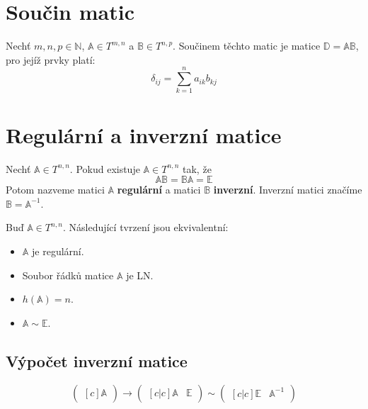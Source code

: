 \documentclass{../szzclass}
\begin{document}
\section{Součin matic}
Nechť $m,n,p\in \mathbb{N}$, $\mathbb{A}\in T^{m,n}$ a $\mathbb{B}\in T^{n,p}$. Součinem těchto matic je matice $\mathbb{D}=\mathbb{A}\mathbb{B}$, pro jejíž prvky platí:
$$
\delta_{ij}=\sum_{k=1}^{n}{a_{ik} b_{kj}}
$$

\section{Regulární a inverzní matice}
\begin{definition}
Nechť $\mathbb{A}\in T^{n,n}$. Pokud existuje $\mathbb{A}\in T^{n,n}$ tak, že 
$$
\mathbb{A}\mathbb{B}=\mathbb{B}\mathbb{A}=\mathbb{E}
$$
Potom nazveme matici $\mathbb{A}$ \textbf{regulární} a matici $\mathbb{B}$ \textbf{inverzní}. Inverzní matici značíme $\mathbb{B}=\mathbb{A}^{-1}$.
\end{definition}

\begin{theorem}
Buď $\mathbb{A}\in T^{n,n}$. Následující tvrzení jsou ekvivalentní:
\begin{itemize}
\item $\mathbb{A}$ je regulární.
\item Soubor řádků matice $\mathbb{A}$ je LN.
\item $h(\mathbb{A}) = n$.
\item $\mathbb{A} \sim \mathbb{E}$.
\end{itemize}
\end{theorem}

\subsection{Výpočet inverzní matice}
\textit{}
\begin{equation}
\begin{pmatrix}[c]
\mathbb{A}
\end{pmatrix} \rightarrow
\begin{pmatrix}[c|c]
\mathbb{A} & \mathbb{E}
\end{pmatrix} \sim
\begin{pmatrix}[c|c]
\mathbb{E} & \mathbb{A}^{-1}
\end{pmatrix}
\end{equation}
\end{document}
